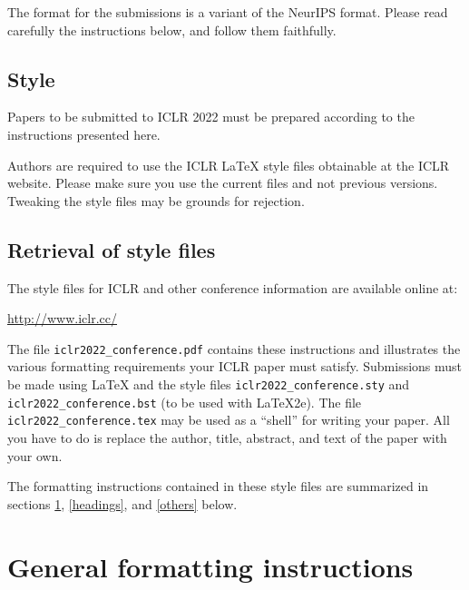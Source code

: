 \documentclass{article} %
\begin{document}
The format for the submissions is a variant of the NeurIPS format.
Please read carefully the instructions below, and follow them
faithfully.

\subsection{Style}

Papers to be submitted to ICLR 2022 must be prepared according to the
instructions presented here.


Authors are required to use the ICLR \LaTeX{} style files obtainable at the
ICLR website. Please make sure you use the current files and
not previous versions. Tweaking the style files may be grounds for rejection.

\subsection{Retrieval of style files}

The style files for ICLR and other conference information are available online at:
\begin{center}
   \url{http://www.iclr.cc/}
\end{center}
The file \verb+iclr2022_conference.pdf+ contains these
instructions and illustrates the
various formatting requirements your ICLR paper must satisfy.
Submissions must be made using \LaTeX{} and the style files
\verb+iclr2022_conference.sty+ and \verb+iclr2022_conference.bst+ (to be used with \LaTeX{}2e). The file
\verb+iclr2022_conference.tex+ may be used as a ``shell'' for writing your paper. All you
have to do is replace the author, title, abstract, and text of the paper with
your own.

The formatting instructions contained in these style files are summarized in
sections \ref{gen_inst}, \ref{headings}, and \ref{others} below.

\section{General formatting instructions}
\label{gen_inst}
\end{document}
